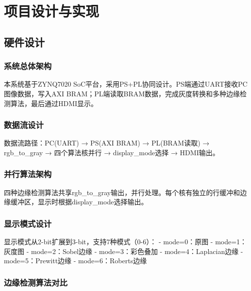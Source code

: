 
\section{项目设计与实现}

\subsection{硬件设计}

\subsubsection{系统总体架构}

本系统基于ZYNQ7020 SoC平台，采用PS+PL协同设计。PS端通过UART接收PC图像数据，写入AXI BRAM；PL端读取BRAM数据，完成灰度转换和多种边缘检测算法，最后通过HDMI显示。

\subsubsection{数据流设计}

数据流路径：PC(UART) → PS(AXI BRAM) → PL(BRAM读取) → rgb\_to\_gray → 四个算法核并行 → display\_mode选择 → HDMI输出。

\subsubsection{并行算法架构}

四种边缘检测算法共享rgb\_to\_gray输出，并行处理。每个核有独立的行缓冲和边缘缓冲区，显示时根据display\_mode选择输出。

\subsubsection{显示模式设计}

显示模式从2-bit扩展到3-bit，支持7种模式（0-6）：
- mode=0：原图
- mode=1：灰度图
- mode=2：Sobel边缘
- mode=3：彩色叠加
- mode=4：Laplacian边缘
- mode=5：Prewitt边缘
- mode=6：Roberts边缘

\subsubsection{边缘检测算法对比}

